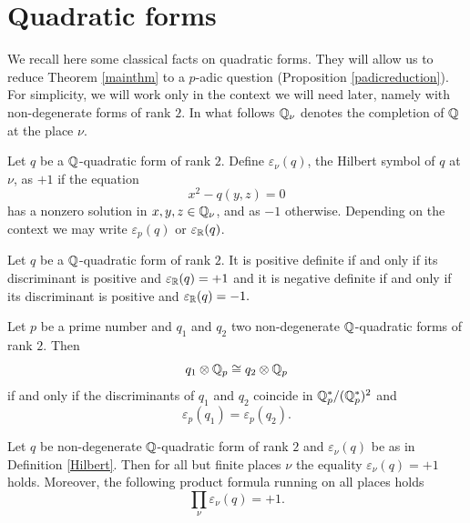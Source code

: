 \documentclass[11pt]{amsart}
\begin{document}
\section{Quadratic forms}
We recall here some classical facts on quadratic forms. They will allow us to reduce Theorem \ref{mainthm} to a $p$-adic question (Proposition \ref{padicreduction}). For simplicity, we will  work only in the context we will need later, namely with non-degenerate  forms of rank $2$.
In what follows $\mathbb{Q}_\nu$ denotes the completion of $\mathbb{Q}$ at the place $\nu$.
\begin{definition}\label{Hilbert}
Let $q$ be a $\mathbb{Q}$-quadratic form of rank $2$. Define $\varepsilon_\nu(q)$, the Hilbert symbol of $q$ at $\nu$, as  $+1$ if the equation
\[x^2-q(y,z)=0\]
has a nonzero solution in $x,y,z\in \mathbb{Q}_\nu$, and as $-1$ otherwise. Depending on the context we may write $\varepsilon_p(q)$ or $\varepsilon_{\mathbb{R}}(q)$.
\end{definition}

\begin{remark}\label{remarksignature}
Let $q$ be a $\mathbb{Q}$-quadratic form of rank $2$. It is positive definite if and only if its discriminant is positive and $\varepsilon_{\mathbb{R}}(q)=+1$
and it is negative definite if and only if its discriminant is positive and $\varepsilon_{\mathbb{R}}(q)=-1.$
\end{remark}

\begin{prop}\label{localinvariant} 
Let $p$ be a prime number and $q_1$ and $q_2$   two non-degenerate $\mathbb{Q}$-quadratic forms of rank $2$. Then 
\[q_1 \otimes \mathbb{Q}_p \cong q_2 \otimes \mathbb{Q}_p\]
if and only if the discriminants of $q_1$ and $q_2$ coincide in $\mathbb{Q}_p^*/(\mathbb{Q}_p^*)^2$ and 
\[\varepsilon_p(q_1)=\varepsilon_p(q_2).\]
\end{prop}

\begin{theorem}\label{productformula} 
Let $q$ be non-degenerate $\mathbb{Q}$-quadratic form of rank $2$ and $\varepsilon_\nu(q)$ be as in Definition \ref{Hilbert}. Then for all but finite places $\nu$ the equality $\varepsilon_\nu(q)=+1$ holds. Moreover, the following product formula running on all places holds
\[\prod_\nu  \varepsilon_\nu(q)= +1.\]
\end{theorem}
\end{document}

